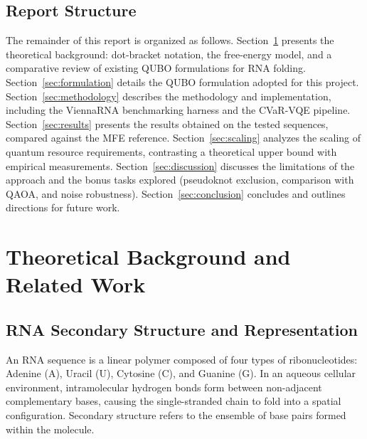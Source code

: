 \documentclass[11pt,a4paper]{article}
\begin{document}
	\subsection{Report Structure}
	
	The remainder of this report is organized as follows. Section~\ref{sec:background} presents the theoretical background: dot-bracket notation, the free-energy model, and a comparative review of existing QUBO formulations for RNA folding. Section~\ref{sec:formulation} details the QUBO formulation adopted for this project. Section~\ref{sec:methodology} describes the methodology and implementation, including the ViennaRNA benchmarking harness and the CVaR-VQE pipeline. Section~\ref{sec:results} presents the results obtained on the tested sequences, compared against the MFE reference. Section~\ref{sec:scaling} analyzes the scaling of quantum resource requirements, contrasting a theoretical upper bound with empirical measurements. Section~\ref{sec:discussion} discusses the limitations of the approach and the bonus tasks explored (pseudoknot exclusion, comparison with QAOA, and noise robustness). Section~\ref{sec:conclusion} concludes and outlines directions for future work.
	
	\clearpage
	
	\section{Theoretical Background and Related Work}
	\label{sec:background}
	
	\subsection{RNA Secondary Structure and Representation}
	
	An RNA sequence is a linear polymer composed of four types of ribonucleotides: Adenine (A), Uracil (U), Cytosine (C), and Guanine (G). In an aqueous cellular environment, intramolecular hydrogen bonds form between non-adjacent complementary bases, causing the single-stranded chain to fold into a spatial configuration. Secondary structure refers to the ensemble of base pairs formed within the molecule.
	
\end{document}
